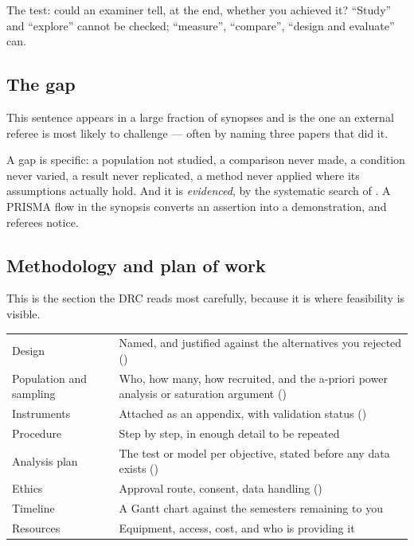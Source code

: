 The test: could an examiner tell, at the end, whether you achieved it? ``Study''
and ``explore'' cannot be checked; ``measure'', ``compare'', ``design and
evaluate'' can.

\subsection{The gap}

\begin{pitfall}
This sentence appears in a large fraction of synopses and is the one an
external referee is most likely to challenge --- often by naming three papers
that did it.

\medskip
A gap is specific: a population not studied, a comparison never made, a
condition never varied, a result never replicated, a method never applied where
its assumptions actually hold. And it is \emph{evidenced}, by the systematic
search of . A PRISMA flow in the synopsis converts an assertion into
a demonstration, and referees notice.
\end{pitfall}

\subsection{Methodology and plan of work}

This is the section the DRC reads most carefully, because it is where
feasibility is visible.

\begin{center}
\small
\begin{tabular}{@{}L{3.4cm}L{10.9cm}@{}}
\toprule
Design           & Named, and justified against the alternatives you rejected
                   () \\
Population and sampling & Who, how many, how recruited, and the a-priori power
                   analysis or saturation argument () \\
Instruments      & Attached as an appendix, with validation status
                   () \\
Procedure        & Step by step, in enough detail to be repeated \\
Analysis plan    & The test or model per objective, stated before any data
                   exists () \\
Ethics           & Approval route, consent, data handling () \\
Timeline         & A Gantt chart against the semesters remaining to you \\
Resources        & Equipment, access, cost, and who is providing it \\
\bottomrule
\end{tabular}
\end{center}


